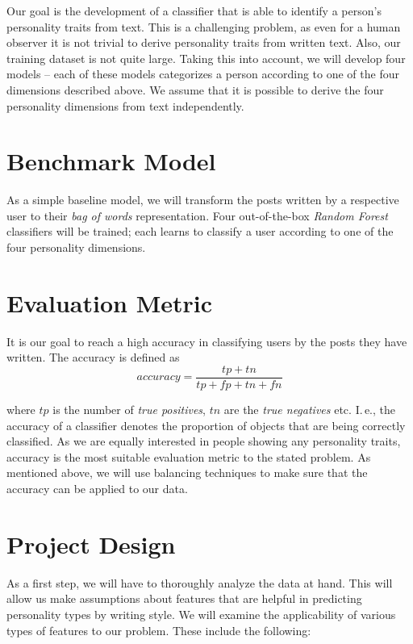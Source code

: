 \documentclass[12pt]{elsarticle}
\begin{document}
Our goal is the development of a classifier that is able to identify a person's personality traits from text. This is a challenging problem, as even for a human observer it is not trivial to derive personality traits from written text. Also, our training dataset is not quite large. Taking this into account, we will develop four models -- each of these models categorizes a person according to one of the four dimensions described above. We assume that it is possible to derive the four personality dimensions from text independently.


\section{Benchmark Model}
As a simple baseline model, we will transform the posts written by a respective user to their \textit{bag of words} representation. Four out-of-the-box \textit{Random Forest} classifiers will be trained; each learns to classify a user according to one of the four personality dimensions. 


\section{Evaluation Metric}
It is our goal to reach a high accuracy in classifying users by the posts they have written. The accuracy is defined as 
\begin{equation}
\nonumber accuracy = \frac{tp + tn}{tp + fp + tn + fn}
\end{equation}

where $tp$ is the number of \textit{true positives}, $tn$ are the \textit{true negatives} etc. I.\,e., the accuracy of a classifier denotes the proportion of objects that are being correctly classified. As we are equally interested in people showing any personality traits, accuracy is the most suitable evaluation metric to the stated problem. As mentioned above, we will use balancing techniques to make sure that the accuracy can be applied to our data.


\section{Project Design}
As a first step, we will have to thoroughly analyze the data at hand. This will allow us make assumptions about features that are helpful in predicting personality types by writing style. We will examine the applicability of various types of features to our problem. These include  the following:
\end{document}
